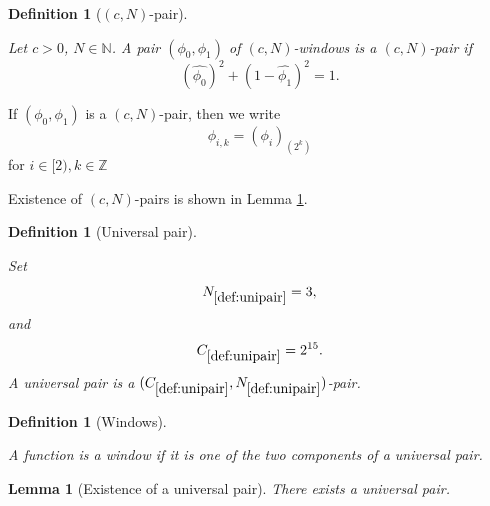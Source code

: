 \documentclass[12pt,reqno]{amsart}
\theoremstyle{plain}
\newtheorem{lemma}[theorem]{Lemma}
\newtheorem{definition}[theorem]{Definition}
\numberwithin{equation}{section}
\theoremstyle{remark}
\newcommand{\uses}[1]{}
\newcommand{\usesdefs}[1]{}
\newcommand{\leanok}{}
\newcommand{\lean}[1]{}
\begin{document}
\begin{definition}[$(c,N)$-pair]
\label{def:cpair}\uses{}\usesdefs{def:cn-window}
\lean{Auto.cPair}
Let $c > 0$, $N\in\mathbb{N}$.  A pair $(\phi_0,\phi_1)$ of $(c,N)$-windows is a {\em $(c,N)$-pair} if
\begin{equation}\label{windowsum}
(\widehat{\phi_0})^2+(1-\widehat{\phi_1})^2=1.
\end{equation}
\end{definition}
If $(\phi_0,\phi_1)$ is a $(c,N)$-pair, then we write
\begin{equation}\label{auto:rescaled-window-notation}\phi_{i,k}=(\phi_i)_{(2^{k})}\end{equation}
for $i\in [2), k\in\mathbb{Z}$

Existence of $(c,N)$-pairs is shown in Lemma \ref{lem:cpair}.

\begin{definition}[Universal pair]\label{def:unipair}\uses{}\usesdefs{def:cpair}
\lean{Auto.uniPair}
Set
\begin{equation}\label{universal pair parameters}
N_{\ref{def:unipair}}=3,
\end{equation}
and
\begin{equation}\label{auto:universal-window-constant}
C_{\ref{def:unipair}}=2^{15}.
\end{equation}
A universal pair is a $(C_{\ref{def:unipair}},N_{\ref{def:unipair}})$-pair.
\end{definition}

\begin{definition}[Windows]\label{def:window}\uses{}\usesdefs{def:unipair}
\lean{Auto.window}
A function is a window if it is one of the two components of a universal pair.
\end{definition}

\begin{lemma}[Existence of a universal pair]\label{lem:cpair}\lean{Auto.existsUniversalPair}\leanok\uses{standard bump properties}\usesdefs{standard bump,def:cn-window,def:cpair,def:unipair}
There exists a universal pair.
\end{lemma}
\end{document}
